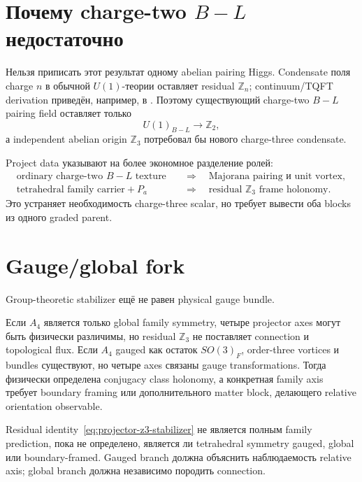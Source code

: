 \section{Почему charge-two \texorpdfstring{\(B-L\)}{B-L} недостаточно}

Нельзя приписать этот результат одному abelian pairing Higgs. Condensate
поля charge \(n\) в обычной \(U(1)\)-теории оставляет residual
\(\mathbb Z_n\); continuum/TQFT derivation приведён, например, в
. Поэтому существующий charge-two
\(B-L\) pairing field оставляет только
\begin{equation}
 U(1)_{B-L}\longrightarrow\mathbb Z_2,
\end{equation}
а independent abelian origin \(\mathbb Z_3\) потребовал бы нового
charge-three condensate.

Project data указывают на более экономное разделение ролей:
\begin{equation}
 \boxed{
 \begin{aligned}
 \text{ordinary charge-two }B-L\text{ texture}
 &\quad\Rightarrow\quad
 \text{Majorana pairing и unit vortex},\\
 \text{tetrahedral family carrier}+P_a
 &\quad\Rightarrow\quad
 \text{residual }\mathbb Z_3\text{ frame holonomy}.
 \end{aligned}}
 \label{eq:two-role-root-architecture}
\end{equation}
Это устраняет необходимость charge-three scalar, но требует вывести оба
blocks из одного graded parent.

\section{Gauge/global fork}

Group-theoretic stabilizer ещё не равен physical gauge bundle.

Если \(A_4\) является только global family symmetry, четыре projector axes
могут быть физически различимы, но residual \(\mathbb Z_3\) не поставляет
connection и topological flux. Если \(A_4\) gauged как остаток
\(SO(3)_F\), order-three vortices и bundles существуют, но четыре axes
связаны gauge transformations. Тогда физически определена conjugacy class
holonomy, а конкретная family axis требует boundary framing или
дополнительного matter block, делающего relative orientation observable.

\begin{nogocriterion}
Residual identity~\eqref{eq:projector-z3-stabilizer} не является полным
family prediction, пока не определено, является ли tetrahedral symmetry
gauged, global или boundary-framed. Gauged branch должна объяснить
наблюдаемость relative axis; global branch должна независимо породить
connection.
\end{nogocriterion}

